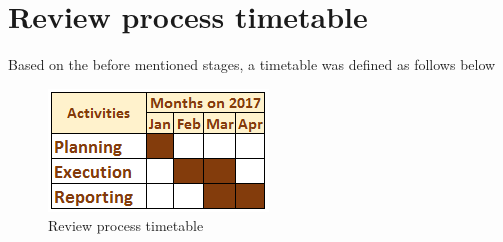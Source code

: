 \section{Review process timetable}

Based on the before mentioned stages, a timetable was defined as follows below

\begin{figure}[!h]
\centering
\includegraphics[scale=1]{images/planning}
\caption{Review process timetable}
\label{fig:planning}
\end{figure}